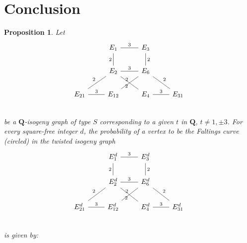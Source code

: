 \documentclass[11pt]{article}
\newtheorem{prop}[defn]{Proposition}
\theoremstyle{definition}
\begin{document}
\newpage
\section{Conclusion}

\begin{prop}
Let 
\[ \begin{tikzcd}
  & E_1 \ar[dash,swap,d,"2"] \ar[dash,r,"3"]   & E_3 \ar[dash,d,"2"] & \\
  & E_2 \ar[dash,swap,dl,"2"] \ar[dash,swap,dr,"2"] \ar[dash,r,"3"]   & E_6  \ar[dash,swap,dl,"2"] \ar[dash,dr,"2"]  & \\
    E_{21} \ar[dash,r,"3"] &   E_{12} & E_ 4 \ar[dash,r,"3"]    & E_{31}  \\
\end{tikzcd}
\]
be a $\mathbf{Q}$-isogeny graph of type $S$ corresponding to a given $t$ in $\mathbf{Q}$, $t\ne 1,\pm 3$. For every square-free integer $d$, 
the probability of a vertex
to be the Faltings curve (circled)
in the twisted isogeny graph 
\[ \begin{tikzcd}
  & E_1^d \ar[dash,swap,d,"2"] \ar[dash,r,"3"]   & E_3^d \ar[dash,d,"2"] & \\
  & E_2^d \ar[dash,swap,dl,"2"] \ar[dash,swap,dr,"2"] \ar[dash,r,"3"]   & E_6^d  \ar[dash,swap,dl,"2"] \ar[dash,dr,"2"]  & \\
    E_{21}^d \ar[dash,r,"3"] &   E_{12}^d & E_ 4^d \ar[dash,r,"3"]    & E_{31}^d  \\
\end{tikzcd}
\]
is given by:

\newpage


\end{prop}
\end{document}
